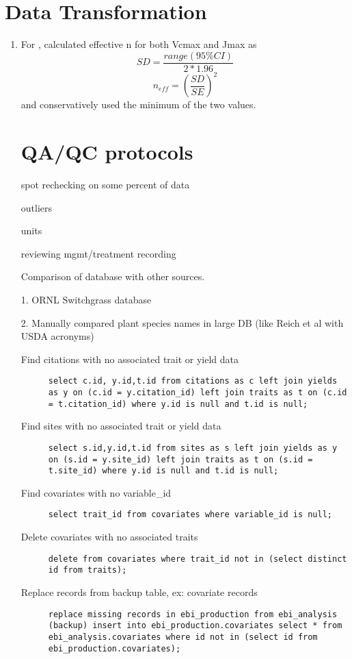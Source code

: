\section{Data Transformation}


\begin{enumerate}
\item For  \citet{wullschleger1993blc}, calculated effective n for both Vcmax and Jmax as
$$SD = \frac{range(95\%CI)}{2*1.96}$$
$$n_{eff}=(\frac{SD}{SE})^2$$
and conservatively used the minimum of the two values.


\section{QA/QC protocols}

spot rechecking on some percent of data

outliers

units

reviewing mgmt/treatment recording

Comparison of database with other sources.

1. ORNL Switchgrass database \cite{gunderson2008epu}

2. Manually compared plant species names in large DB (like Reich et al with USDA acronyms)

\begin{description}
\item[Find citations with no associated trait or yield data]  \verb+select c.id, y.id,t.id from citations as c left join yields as y on (c.id = y.citation_id) left join traits as t on (c.id = t.citation_id) where y.id is null and t.id is null;+
\item[Find sites with no associated trait or yield data]
  \verb+select s.id,y.id,t.id from sites as s left join yields as y on (s.id = y.site_id) left join traits as t on (s.id = t.site_id) where y.id is null and t.id is null;+

\item[Find covariates with no variable\_id]  \verb+select trait_id from covariates where variable_id is null;+

\item[Delete covariates with no associated traits]  \verb+delete from covariates where trait_id not in (select distinct id from traits);+

\item[Replace records from backup table, ex: covariate records]  \verb+replace missing records in ebi_production from ebi_analysis (backup) insert into ebi_production.covariates select * from ebi_analysis.covariates where id not in (select id from ebi_production.covariates);+


\end{description}
\end{enumerate}
